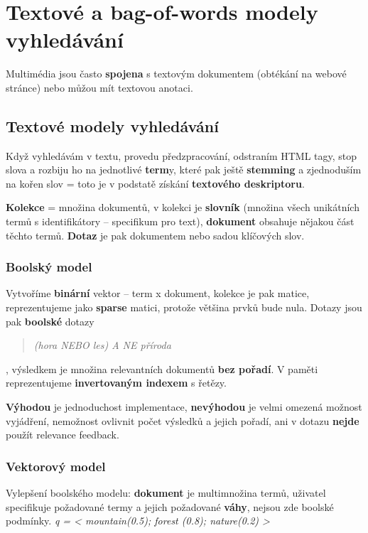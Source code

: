 \section{Textové a bag-of-words modely vyhledávání}

Multimédia jsou často \textbf{spojena} s textovým dokumentem (obtékání na webové stránce) nebo můžou mít textovou anotaci.

\subsection{Textové modely vyhledávání}

Když vyhledávám v textu, provedu předzpracování, odstraním HTML tagy, stop slova a rozbiju ho na jednotlivé \textbf{term}y, které pak ještě \textbf{stemming} a zjednoduším na kořen slov = toto je v podstatě získání \textbf{textového deskriptoru}.

\textbf{Kolekce} = množina dokumentů, v kolekci je \textbf{slovník} (množina všech unikátních termů s identifikátory -- specifikum pro text), \textbf{dokument} obsahuje nějakou část těchto termů. \textbf{Dotaz} je pak dokumentem nebo sadou klíčových slov.

\subsubsection{Boolský model}

Vytvoříme \textbf{binární} vektor -- term x dokument, kolekce je pak matice, reprezentujeme jako \textbf{sparse} matici, protože většina prvků bude nula. Dotazy jsou pak \textbf{boolské} dotazy \blockquote{\textit{(hora NEBO les) A NE příroda}}, výsledkem je množina relevantních dokumentů \textbf{bez pořadí}. V paměti reprezentujeme \textbf{invertovaným indexem} s řetězy.

\textbf{Výhodou} je jednoduchost implementace, \textbf{nevýhodou} je velmi omezená možnost vyjádření, nemožnost ovlivnit počet výsledků a jejich pořadí, ani v dotazu \textbf{nejde} použít relevance feedback.

\subsubsection{Vektorový model}

Vylepšení boolského modelu: \textbf{dokument} je multimnožina termů, uživatel specifikuje požadované termy a jejich požadované \textbf{váhy}, nejsou zde boolské podmínky. \textit{q = < mountain(0.5); forest (0.8); nature(0.2) >}

